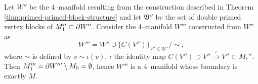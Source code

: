 \begin{cor}
	Let $W''$ be the 4--manifold resulting from the construction described in Theorem \ref{thm:primed-primed-block-structure} and let $\mathfrak{V}''$ be the set of double primed vertex blocks of $M_1''\subset\partial W''$.
	Consider the 4--manifold $W'''$ constructed from $W''$ as
	\[
	W''' = W''\cup\{C(V'')\}_{V''\in \mathfrak{V}''} / \sim,
	\]
	where $\sim$ is defined by $v\sim \iota(v)$, $\iota$ the identity map $C(V'')\supset V''\overset{\iota}{\to} V''\subset M_1''$.
	Then $M_1'''=\partial W'''\setminus M_0=\emptyset$, hence $W'''$ is a 4--manifold whose boundary is exactly $M$.
\end{cor}


